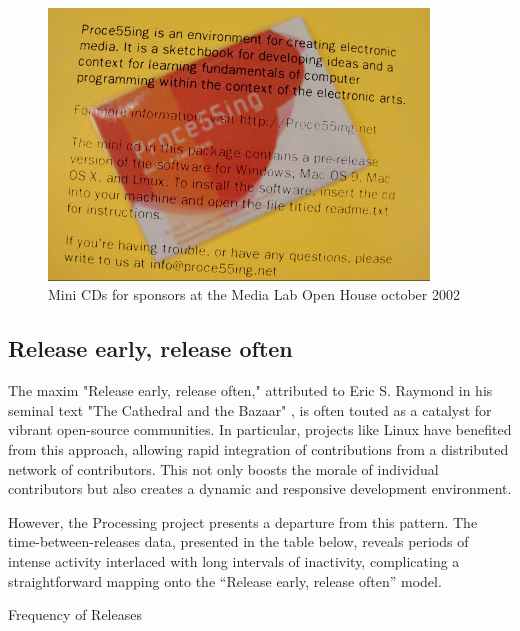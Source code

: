 

\begin{figure}
	\centering
	\includegraphics[width=0.9\textwidth]{images/processing-mini-cd.png}
	\caption{Mini CDs for sponsors at the Media Lab Open House october 2002}
	\label{fig:processing-cd}
\end{figure}
\subsection{Release early, release often}
The maxim "Release early, release often," attributed to Eric S. Raymond in his seminal text "The Cathedral and the Bazaar" \parencite{raymondCathedralBazaar1999}, is often touted as a catalyst for vibrant open-source communities. In particular, projects like Linux have benefited from this approach, allowing rapid integration of contributions from a distributed network of contributors. This not only boosts the morale of individual contributors but also creates a dynamic and responsive development environment.

However, the Processing project presents a departure from this pattern. The time-between-releases data, presented in the table below, reveals periods of intense activity interlaced with long intervals of inactivity, complicating a straightforward mapping onto the “Release early, release often” model.

\changepapersize{305.3mm:210mm}

{
	\LARGE
	\noindent Frequency of Releases\par
	\vspace{0.2cm} 
}

